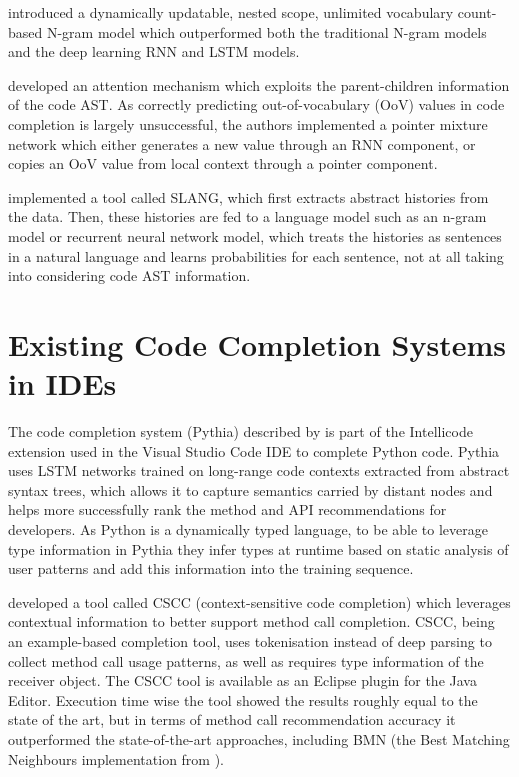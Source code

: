 \cite{Hell17a} introduced a dynamically updatable, nested scope, unlimited vocabulary count-based N-gram model which outperformed both the traditional N-gram models and the deep learning RNN and LSTM models.

\cite{Li17a} developed an attention mechanism which exploits the parent-children information of the code AST. As correctly predicting out-of-vocabulary (OoV) values in code completion is largely unsuccessful, the authors implemented a pointer mixture network which either generates a new value through an RNN component, or copies an OoV value from local context through a pointer component.

\cite{Rayc14a} implemented a tool called SLANG, which ﬁrst extracts abstract histories from the data. Then, these histories are fed to a language model such as an n-gram model or recurrent neural network model, which treats the histories as sentences in a natural language and learns probabilities for each sentence, not at all taking into considering code AST information.

\section{Existing Code Completion Systems in IDEs}
\label{sec:RelatedWorks-ExistingSystems}
The code completion system (Pythia) described by \cite{Svya19a} is part of the Intellicode extension used in the Visual Studio Code IDE to complete Python code. Pythia uses LSTM networks trained on long-range code contexts extracted from abstract syntax trees, which allows it to capture semantics carried by distant nodes and helps more successfully rank the method and API recommendations for developers. As Python is a dynamically typed language, to be able to leverage type information in Pythia they infer types at runtime based on static analysis of user patterns and add this information into the training sequence.

\cite{Asad14a} developed a tool called CSCC (context-sensitive code completion) which leverages contextual information to better support method call completion. CSCC, being an example-based completion tool, uses tokenisation instead of deep parsing to collect method call usage patterns, as well as requires type information of the receiver object. The CSCC tool is available as an Eclipse plugin for the Java Editor. Execution time wise the tool showed the results roughly equal to the state of the art, but in terms of method call recommendation accuracy it outperformed the state-of-the-art approaches, including BMN (the Best Matching Neighbours implementation from \cite{Bruc09a}).

